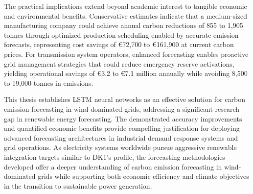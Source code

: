 The practical implications extend beyond academic interest to tangible economic and environmental benefits. Conservative estimates indicate that a medium-sized manufacturing company could achieve annual carbon reductions of 855 to 1,905 tonnes \cotwoe{} through optimized production scheduling enabled by accurate emission forecasts, representing cost savings of \euro72,700 to \euro161,900 at current carbon prices. For transmission system operators, enhanced forecasting enables proactive grid management strategies that could reduce emergency reserve activations, yielding operational savings of \euro3.2 to \euro7.1 million annually while avoiding 8,500 to 19,000 tonnes \cotwoe{} in emissions.

This thesis establishes LSTM neural networks as an effective solution for carbon emission forecasting in wind-dominated grids, addressing a significant research gap in renewable energy forecasting. The demonstrated accuracy improvements and quantified economic benefits provide compelling justification for deploying advanced forecasting architectures in industrial demand response systems and grid operations. As electricity systems worldwide pursue aggressive renewable integration targets similar to DK1's profile, the forecasting methodologies developed offer a deeper understanding of carbon emission forecasting in wind-dominated grids while supporting both economic efficiency and climate objectives in the transition to sustainable power generation.
